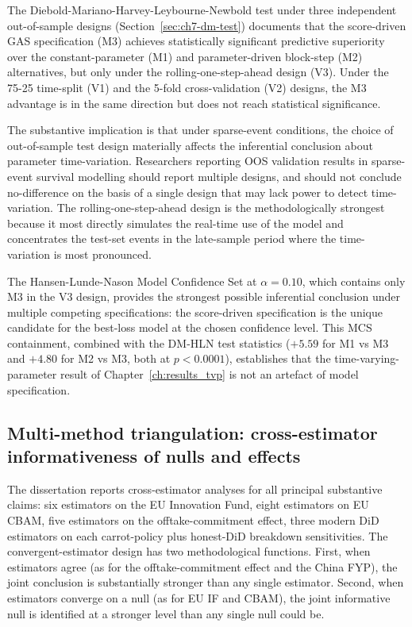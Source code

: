 The Diebold-Mariano-Harvey-Leybourne-Newbold test under three independent out-of-sample designs (Section~\ref{sec:ch7-dm-test}) documents that the score-driven GAS specification (M3) achieves statistically significant predictive superiority over the constant-parameter (M1) and parameter-driven block-step (M2) alternatives, but only under the rolling-one-step-ahead design (V3). Under the 75-25 time-split (V1) and the 5-fold cross-validation (V2) designs, the M3 advantage is in the same direction but does not reach statistical significance.

The substantive implication is that under sparse-event conditions, the choice of out-of-sample test design materially affects the inferential conclusion about parameter time-variation. Researchers reporting OOS validation results in sparse-event survival modelling should report multiple designs, and should not conclude no-difference on the basis of a single design that may lack power to detect time-variation. The rolling-one-step-ahead design is the methodologically strongest because it most directly simulates the real-time use of the model and concentrates the test-set events in the late-sample period where the time-variation is most pronounced.

The Hansen-Lunde-Nason Model Confidence Set at $\alpha = 0.10$, which contains only M3 in the V3 design, provides the strongest possible inferential conclusion under multiple competing specifications: the score-driven specification is the unique candidate for the best-loss model at the chosen confidence level. This MCS containment, combined with the DM-HLN test statistics ($+5.59$ for M1 vs M3 and $+4.80$ for M2 vs M3, both at $p < 0.0001$), establishes that the time-varying-parameter result of Chapter~\ref{ch:results_tvp} is not an artefact of model specification.

\subsection{Multi-method triangulation: cross-estimator informativeness of nulls and effects}
\label{sec:ch10-triangulation}

The dissertation reports cross-estimator analyses for all principal substantive claims: six estimators on the EU Innovation Fund, eight estimators on EU CBAM, five estimators on the offtake-commitment effect, three modern DiD estimators on each carrot-policy plus honest-DiD breakdown sensitivities. The convergent-estimator design has two methodological functions. First, when estimators agree (as for the offtake-commitment effect and the China FYP), the joint conclusion is substantially stronger than any single estimator. Second, when estimators converge on a null (as for EU IF and CBAM), the joint informative null is identified at a stronger level than any single null could be.

